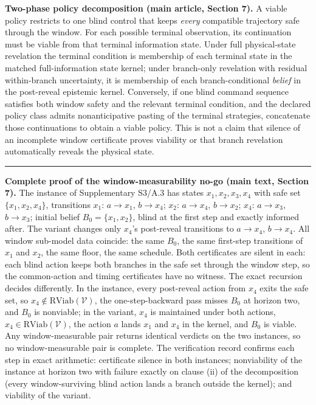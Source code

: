 \documentclass[11pt]{article}
\theoremstyle{definition}
\begin{document}
\bigskip
\noindent\textbf{Two-phase policy decomposition (main article, Section 7).} A viable policy restricts to one blind control that keeps \emph{every} compatible trajectory safe through the window. For each possible terminal observation, its continuation must be viable from that terminal information state. Under full physical-state revelation the terminal condition is membership of each terminal state in the matched full-information state kernel; under branch-only revelation with residual within-branch uncertainty, it is membership of each branch-conditional \emph{belief} in the post-reveal epistemic kernel. Conversely, if one blind command sequence satisfies both window safety and the relevant terminal condition, and the declared policy class admits nonanticipative pasting of the terminal strategies, concatenate those continuations to obtain a viable policy. This is not a claim that silence of an incomplete window certificate proves viability or that branch revelation automatically reveals the physical state.
\rule{0.5\linewidth}{0.5pt}

\bigskip
\noindent\textbf{Complete proof of the window-measurability no-go (main text, Section 7).}
The instance of Supplementary S3/A.3 has states \(x_{1}, x_{2}, x_{3}, x_{4}\) with safe
set \(\{x_{1}, x_{2}, x_{4}\}\), transitions \(x_{1}\): \(a \to x_{1}\), \(b \to x_{4}\);
\(x_{2}\): \(a \to x_{4}\), \(b \to x_{2}\); \(x_{4}\): \(a \to x_{3}\), \(b \to x_{3}\);
initial belief \(B_{0} = \{x_{1}, x_{2}\}\), blind at the first step and exactly informed
after. The variant changes only \(x_{4}\)'s post-reveal transitions to
\(a \to x_{4}\), \(b \to x_{4}\). All window sub-model data coincide: the same \(B_{0}\),
the same first-step transitions of \(x_{1}\) and \(x_{2}\), the same floor, the same
schedule. Both certificates are silent in each: each blind action keeps both branches in
the safe set through the window step, so the common-action and timing certificates have no
witness. The exact recursion decides differently. In the instance, every post-reveal action
from \(x_{4}\) exits the safe set, so \(x_{4} \notin \mathrm{RViab}(\mathcal{V})\), the
one-step-backward pass misses \(B_{0}\) at horizon two, and \(B_{0}\) is nonviable; in the
variant, \(x_{4}\) is maintained under both actions, \(x_{4} \in
\mathrm{RViab}(\mathcal{V})\), the action \(a\) lands \(x_{1}\) and \(x_{4}\) in the
kernel, and \(B_{0}\) is viable. Any window-measurable pair returns identical verdicts on
the two instances, so no window-measurable pair is complete. The verification record
confirms each step in exact arithmetic: certificate silence in both instances; nonviability
of the instance at horizon two with failure exactly on clause (ii) of the decomposition
(every window-surviving blind action lands a branch outside the kernel); and viability of
the variant.
\end{document}
